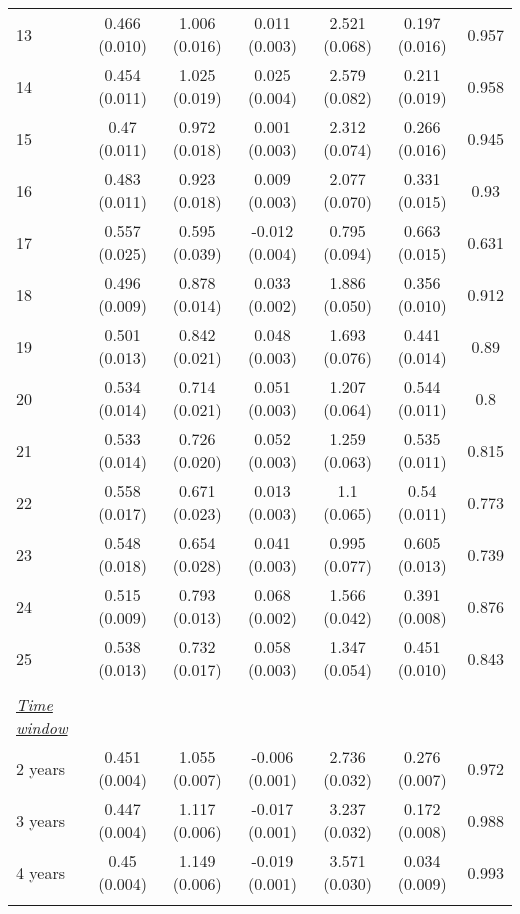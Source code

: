 \begin{tabular}{@{\extracolsep{5pt}} l cccccc}
13 & 0.466 (0.010) & 1.006 (0.016) & 0.011 (0.003) & 2.521 (0.068) & 0.197 (0.016) & 0.957 \\ 
14 & 0.454 (0.011) & 1.025 (0.019) & 0.025 (0.004) & 2.579 (0.082) & 0.211 (0.019) & 0.958 \\ 
15 & 0.47 (0.011) & 0.972 (0.018) & 0.001 (0.003) & 2.312 (0.074) & 0.266 (0.016) & 0.945 \\ 
16 & 0.483 (0.011) & 0.923 (0.018) & 0.009 (0.003) & 2.077 (0.070) & 0.331 (0.015) & 0.93 \\ 
17 & 0.557 (0.025) & 0.595 (0.039) & -0.012 (0.004) & 0.795 (0.094) & 0.663 (0.015) & 0.631 \\ 
18 & 0.496 (0.009) & 0.878 (0.014) & 0.033 (0.002) & 1.886 (0.050) & 0.356 (0.010) & 0.912 \\ 
19 & 0.501 (0.013) & 0.842 (0.021) & 0.048 (0.003) & 1.693 (0.076) & 0.441 (0.014) & 0.89 \\ 
20 & 0.534 (0.014) & 0.714 (0.021) & 0.051 (0.003) & 1.207 (0.064) & 0.544 (0.011) & 0.8 \\ 
21 & 0.533 (0.014) & 0.726 (0.020) & 0.052 (0.003) & 1.259 (0.063) & 0.535 (0.011) & 0.815 \\ 
22 & 0.558 (0.017) & 0.671 (0.023) & 0.013 (0.003) & 1.1 (0.065) & 0.54 (0.011) & 0.773 \\ 
23 & 0.548 (0.018) & 0.654 (0.028) & 0.041 (0.003) & 0.995 (0.077) & 0.605 (0.013) & 0.739 \\ 
24 & 0.515 (0.009) & 0.793 (0.013) & 0.068 (0.002) & 1.566 (0.042) & 0.391 (0.008) & 0.876 \\ 
25 & 0.538 (0.013) & 0.732 (0.017) & 0.058 (0.003) & 1.347 (0.054) & 0.451 (0.010) & 0.843 \\ 
 &   &   &   &   &   &  \\ 
\underline{{\it Time window}} &   &   &   &   &   &  \\ 
2 years & 0.451 (0.004) & 1.055 (0.007) & -0.006 (0.001) & 2.736 (0.032) & 0.276 (0.007) & 0.972 \\ 
3 years & 0.447 (0.004) & 1.117 (0.006) & -0.017 (0.001) & 3.237 (0.032) & 0.172 (0.008) & 0.988 \\ 
4 years & 0.45 (0.004) & 1.149 (0.006) & -0.019 (0.001) & 3.571 (0.030) & 0.034 (0.009) & 0.993 \\ 
\hline \\[-1.8ex] 
\end{tabular} 
